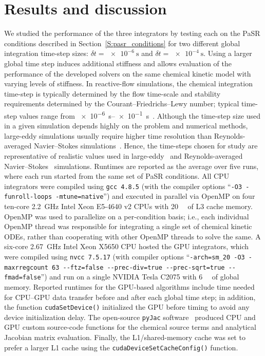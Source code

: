 \documentclass[preprint,review,11pt]{elsarticle}
\begin{document}
\section{Results and discussion}
\label{S:results}

We studied the performance of the three integrators by testing each on the PaSR conditions described in Section~\ref{S:pasr_conditions} for two different global integration time-step sizes: $\delta t = \SI{e-6}{\s}$ and $\delta t = \SI{e-4}{\s}$.
Using a larger global time step induces additional stiffness and allows evaluation of the performance of the developed solvers on the same chemical kinetic model with varying levels of stiffness.
In reactive-flow simulations, the chemical integration time-step is typically determined by the flow time-scale and stability requirements determined by the Courant--Friedrichs--Lewy number; typical time-step values range from \SIrange{e-6}{e-1}{\s}~\cite{Yang:2013ip}.
Although the time-step size used in a given simulation depends highly on the problem and numerical methods, large-eddy simulations usually require higher time resolution than Reynolds-averaged Navier--Stokes simulations~\cite{Iaccarino:2003147}.
Hence, the time-steps chosen for study are representative of realistic values used in large-eddy~\cite{Wang20111319,Bulat20133155} and Reynolds-averaged Navier--Stokes~\cite{Ramirez2010,Galloni20091131} simulations.
Runtimes are reported as the average over five runs, where each run started from the same set of PaSR conditions.
All CPU integrators were compiled using \texttt{gcc 4.8.5} (with the compiler options ``\texttt{-O3 -funroll-loops -mtune=native}'') and executed in parallel via OpenMP on four ten-core \SI{2.2}{\giga\hertz} Intel Xeon E5-4640 v2 CPUs with \SI{20}{\mega\byte} of L3 cache memory.
OpenMP was used to parallelize on a per-condition basis; i.e., each individual OpenMP thread was responsible for integrating a single set of chemical kinetic ODEs, rather than cooperating with other OpenMP threads to solve the same.
A six-core \SI{2.67}{\giga\hertz} Intel Xeon X5650 CPU hosted the GPU integrators, which were compiled using \texttt{nvcc 7.5.17} (with compiler options ``\texttt{-arch=sm\_20 -O3 -maxrregcount 63 -{}-ftz=false -{}-prec-div=true -{}-prec-sqrt=true -{}-fmad=false}'') and run on a single NVIDIA Tesla C2075 with \SI{6}{\giga\byte} of global memory.
Reported runtimes for the GPU-based algorithms include time needed for CPU--GPU data transfer before and after each global time step; in addition, the function \texttt{cudaSetDevice()} initialized the GPU before timing to avoid any device initialization delay.
The open-source \texttt{pyJac} software~\cite{niemeyer_2016_51139,Niemeyer:2015ws,Niemeyer:2016aa} produced CPU and GPU custom source-code functions for the chemical source terms and analytical Jacobian matrix evaluation.
Finally, the L1\slash shared-memory cache was set to prefer a larger L1 cache using the \texttt{cudaDeviceSetCacheConfig()} function.
\end{document}
